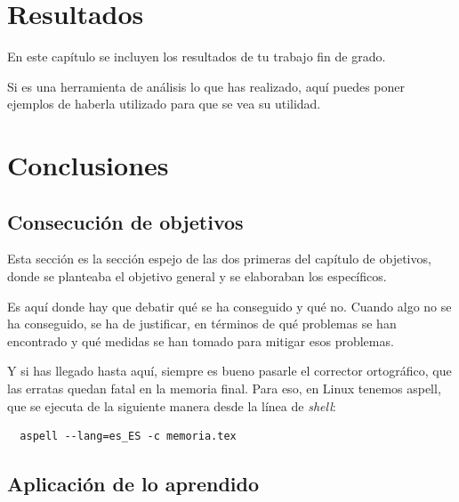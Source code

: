 \documentclass[a4paper, 12pt]{book}
\begin{document}

\cleardoublepage
\chapter{Resultados}
En este capítulo se incluyen los resultados de tu trabajo fin de grado.

Si es una herramienta de análisis lo que has realizado, aquí puedes poner ejemplos de haberla utilizado para que se vea su utilidad.



\cleardoublepage
\chapter{Conclusiones}
\label{chap:conclusiones}

\section{Consecución de objetivos}
\label{sec:consecucion-objetivos}

Esta sección es la sección espejo de las dos primeras del capítulo de objetivos, donde se planteaba el objetivo general y se elaboraban los específicos.

Es aquí donde hay que debatir qué se ha conseguido y qué no. 
Cuando algo no se ha conseguido, se ha de justificar, en términos de qué problemas se han encontrado y qué medidas se han tomado para mitigar esos problemas.

Y si has llegado hasta aquí, siempre es bueno pasarle el corrector ortográfico, que las erratas quedan fatal en la memoria final.
Para eso, en Linux tenemos aspell, que se ejecuta de la siguiente manera desde la línea de \emph{shell}:

\begin{verbatim}
  aspell --lang=es_ES -c memoria.tex
\end{verbatim}

\section{Aplicación de lo aprendido}
\label{sec:aplicacion}
\end{document}
